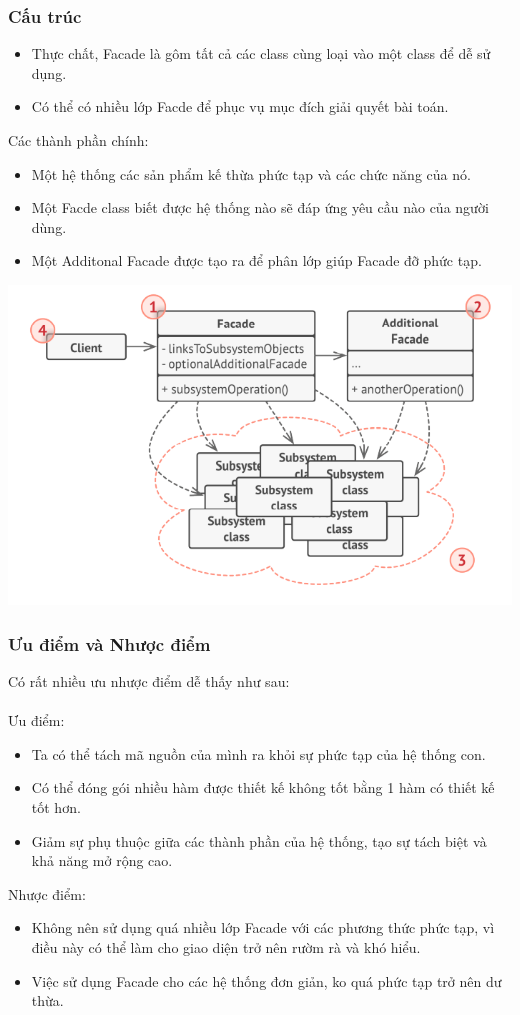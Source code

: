 \subsubsection{Cấu trúc}
\begin{itemize}
    \item Thực chất, Facade là gôm tất cả các class cùng loại vào một class để dễ sử dụng.
    \item Có thể có nhiều lớp Facde để phục vụ mục đích giải quyết bài toán.
\end{itemize}
Các thành phần chính:
\begin{itemize}
    \item Một hệ thống các sản phẩm kế thừa phức tạp và các chức năng của nó.
    \item Một Facde class biết được hệ thống nào sẽ đáp ứng yêu cầu nào của người dùng.
    \item Một Additonal Facade được tạo ra để phân lớp giúp Facade đỡ phức tạp.
\end{itemize}
\begin{center}
    \includegraphics[scale=0.5]{image/structural/facade.png}
\end{center}

\subsubsection{Ưu điểm và Nhược điểm}
Có rất nhiều ưu nhược điểm dễ thấy như sau:\\\\
Ưu điểm:
\begin{itemize}
    \item Ta có thể tách mã nguồn của mình ra khỏi sự phức tạp của hệ thống con.
    \item Có thể đóng gói nhiều hàm được thiết kế không tốt bằng 1 hàm có thiết kế tốt hơn.
    \item Giảm sự phụ thuộc giữa các thành phần của hệ thống, tạo sự tách biệt và khả năng mở rộng cao.
\end{itemize}
Nhược điểm:
\begin{itemize}
    \item Không nên sử dụng quá nhiều lớp Facade với các phương thức phức tạp, vì điều này có thể làm cho giao diện trở nên rườm rà và khó hiểu.
    \item Việc sử dụng Facade cho các hệ thống đơn giản, ko quá phức tạp trở nên dư thừa.
\end{itemize}

